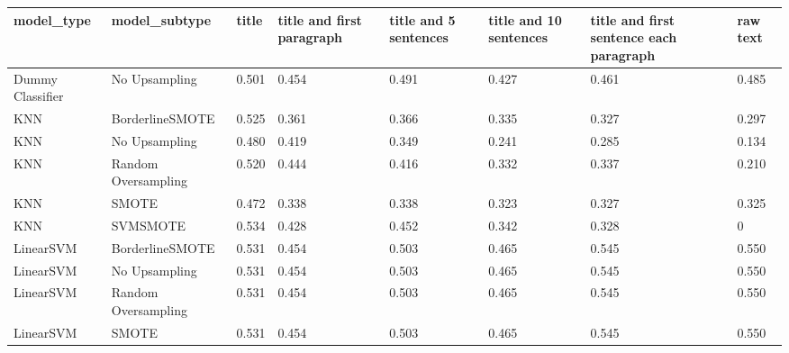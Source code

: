 \begin{tabular}{llllllll}
\toprule
                  model\_type &       model\_subtype & title & title and first paragraph & title and 5 sentences & title and 10 sentences & title and first sentence each paragraph &  raw text \\
\midrule
            Dummy Classifier &       No Upsampling & 0.501 &                     0.454 &                 0.491 &                  0.427 &                                   0.461 &     0.485 \\
                         KNN &     BorderlineSMOTE & 0.525 &                     0.361 &                 0.366 &                  0.335 &                                   0.327 &     0.297 \\
                         KNN &       No Upsampling & 0.480 &                     0.419 &                 0.349 &                  0.241 &                                   0.285 &     0.134 \\
                         KNN & Random Oversampling & 0.520 &                     0.444 &                 0.416 &                  0.332 &                                   0.337 &     0.210 \\
                         KNN &               SMOTE & 0.472 &                     0.338 &                 0.338 &                  0.323 &                                   0.327 &     0.325 \\
                         KNN &            SVMSMOTE & 0.534 &                     0.428 &                 0.452 &                  0.342 &                                   0.328 &         0 \\
                   LinearSVM &     BorderlineSMOTE & 0.531 &                     0.454 &                 0.503 &                  0.465 &                                   0.545 &     0.550 \\
                   LinearSVM &       No Upsampling & 0.531 &                     0.454 &                 0.503 &                  0.465 &                                   0.545 &     0.550 \\
                   LinearSVM & Random Oversampling & 0.531 &                     0.454 &                 0.503 &                  0.465 &                                   0.545 &     0.550 \\
                   LinearSVM &               SMOTE & 0.531 &                     0.454 &                 0.503 &                  0.465 &                                   0.545 &     0.550 \\

\end{tabular}
